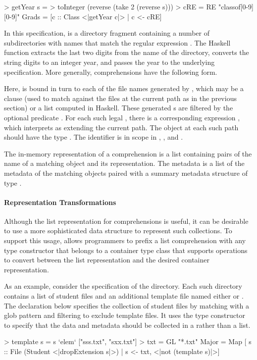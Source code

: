 \begin{code}
> getYear s = 
>   toInteger (reverse (take 2 (reverse s)))
> cRE = RE "classof[0-9][0-9]"
\mbox{}
 Grads = 
  [c :: Class <|getYear c|> | c <-  cRE]
\end{code}
In this specification,  is a directory fragment containing a number of
 subdirectories with names  that match the regular expression
.  The Haskell function  extracts the last two digits from the
name of the directory, converts the string digits to an integer year, and passes
the year to the underlying  specification.
More generally, comprehensions have the following form.
\begin{code}
\end{code}
Here,  is bound in turn to each of the file names generated by
, which may be a  clause (used to match against
the files at the current path as in the previous section) or a list
computed in Haskell.  These generated s are filtered by the
optional predicate .  For each such legal , there is a
corresponding expression , which \forest{} interprets as extending
the current path.  The object at each such path should have the \forest{}
type .  The identifier  is in scope in ,
, and .  

The in-memory representation of a comprehension is a list containing
pairs of the name of a matching object and its representation.  The
metadata is a list of the metadata of the matching objects paired with
a summary metadata structure of type .


\paragraph*{Representation Transformations}
Although the list representation for comprehensions is useful, it can
be desirable to use a more sophisticated data structure to
represent such collections.  To support
this usage, \forest{} allows programmers to prefix a list
comprehension with any type constructor that belongs to a 
container type class that supports operations to convert between the
list representation and the desired container representation. 

As an example, consider the specification of the  directory.
Each such directory contains a list of student files and an additional
template file named either  or .  The
declaration below specifies the collection of student files by
matching with a glob pattern and filtering to exclude 
template files. It uses the  type constructor to specify that
the data and metadata should be collected in a
 rather than a list.
\begin{code}
> template s = s `elem` ["sss.txt", "sxx.txt"]
> txt = GL "*.txt"
\mbox{}
 Major = Map
   [ s :: File (Student <|dropExtension s|>) 
   | s <-  txt, <|not (template s)|>]
\end{code}


